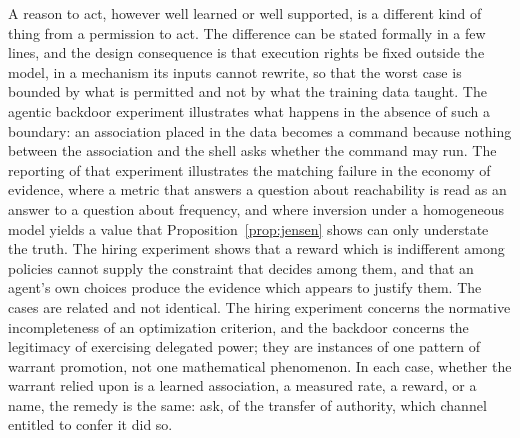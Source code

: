 \documentclass[11pt]{article}
\theoremstyle{definition}
\theoremstyle{remark}
\begin{document}
A reason to act, however well learned or well supported, is a different kind of thing from a permission to act. The difference can be stated formally in a few lines, and the design consequence is that execution rights be fixed outside the model, in a mechanism its inputs cannot rewrite, so that the worst case is bounded by what is permitted and not by what the training data taught. The agentic backdoor experiment illustrates what happens in the absence of such a boundary: an association placed in the data becomes a command because nothing between the association and the shell asks whether the command may run. The reporting of that experiment illustrates the matching failure in the economy of evidence, where a metric that answers a question about reachability is read as an answer to a question about frequency, and where inversion under a homogeneous model yields a value that Proposition~\ref{prop:jensen} shows can only understate the truth. The hiring experiment shows that a reward which is indifferent among policies cannot supply the constraint that decides among them, and that an agent's own choices produce the evidence which appears to justify them. The cases are related and not identical. The hiring experiment concerns the normative incompleteness of an optimization criterion, and the backdoor concerns the legitimacy of exercising delegated power; they are instances of one pattern of warrant promotion, not one mathematical phenomenon. In each case, whether the warrant relied upon is a learned association, a measured rate, a reward, or a name, the remedy is the same: ask, of the transfer of authority, which channel entitled to confer it did so.
\end{document}

